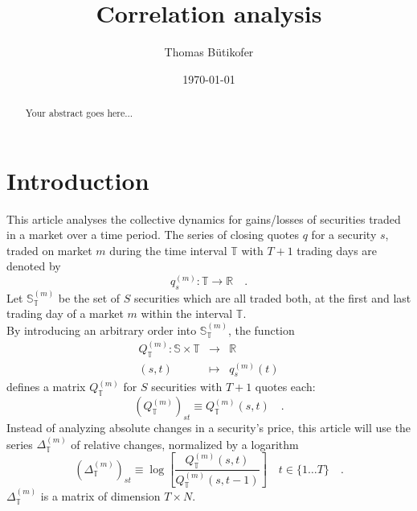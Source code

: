 \documentclass[11pt,twoside,a4paper]{article}
\begin{document}
\title{Correlation analysis}
\author{Thomas Bütikofer}
\date{\today}
\maketitle
\begin{abstract}
Your abstract goes here...
\end{abstract}
\section{Introduction}
This article analyses the collective dynamics for gains/losses of securities traded in a market over a time period.
The series of closing quotes $q$ for a security $s$, traded on market $m$ during the time interval $\mathbb{T}$ with $T+1$ trading days are denoted by
\begin{equation}
q^{(m)}_{s}:\mathbb{T}\rightarrow\mathbb{R}\quad.
\label{eqDefQuoteSeries}
\end{equation}
Let $\mathbb{S}^{(m)}_\mathbb{T}$ be the set of $S$ securities which are all traded both, at the first and last trading day of a market $m$ within the interval $\mathbb{T}$.\\
By introducing an arbitrary order into $\mathbb{S}^{(m)}_\mathbb{T}$, the function
\begin{eqnarray}
Q^{(m)}_{\mathbb{T}}:\mathbb{S}\times\mathbb{T}&\rightarrow&\mathbb{R}\\
(s,t)&\mapsto&q^{(m)}_s(t)
\end{eqnarray}
defines a matrix $Q^{(m)}_{\mathbb{T}}$ for $S$ securities with $T+1$ quotes each:
\begin{equation}
(Q^{(m)}_{\mathbb{T}})_{st}\equiv Q^{(m)}_{\mathbb{T}}(s,t)\quad.
\end{equation}
Instead of analyzing absolute changes in a security's price, this article will use the series $\Delta^{(m)}_{\mathbb{T}}$ of relative changes, normalized by a logarithm 
\begin{equation}
\left(\Delta^{(m)}_{\mathbb{T}}\right)_{st} \equiv \log\left[\frac{Q^{(m)}_{\mathbb{T}}(s,t)}{Q^{(m)}_{\mathbb{T}}(s,t-1)}\right]\quad t\in\{1\ldots T\}\quad.
\end{equation}
$\Delta^{(m)}_{\mathbb{T}}$ is a matrix of dimension $T\times N$.\\
\end{document}
